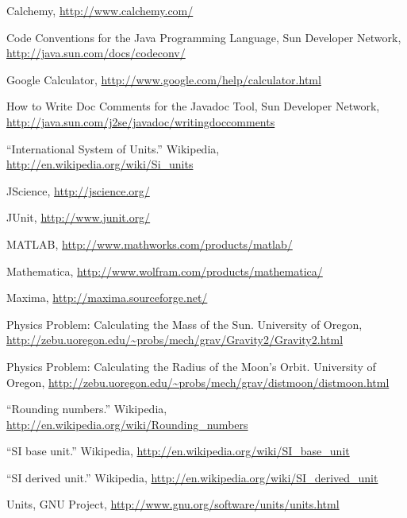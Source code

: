 \begin{thebibliography}{99}

 Calchemy, \url{http://www.calchemy.com/}

 Code Conventions for the Java Programming
  Language, Sun Developer Network,
  \url{http://java.sun.com/docs/codeconv/}

 Google Calculator,
  \url{http://www.google.com/help/calculator.html}

 How to Write Doc Comments for the Javadoc Tool, Sun
  Developer Network,
  \url{http://java.sun.com/j2se/javadoc/writingdoccomments}

 ``International System of Units.''  Wikipedia,
  \url{http://en.wikipedia.org/wiki/Si_units}

 JScience, \url{http://jscience.org/}

 JUnit, \url{http://www.junit.org/}

 MATLAB,
  \url{http://www.mathworks.com/products/matlab/}

 Mathematica,
  \url{http://www.wolfram.com/products/mathematica/}

 Maxima, \url{http://maxima.sourceforge.net/}

 Physics Problem: Calculating the Mass of the Sun.
  University of Oregon,
  \url{http://zebu.uoregon.edu/~probs/mech/grav/Gravity2/Gravity2.html}

 Physics Problem: Calculating the Radius of the
  Moon's Orbit.  University of Oregon,
  \url{http://zebu.uoregon.edu/~probs/mech/grav/distmoon/distmoon.html}

 ``Rounding numbers.''  Wikipedia,
  \url{http://en.wikipedia.org/wiki/Rounding_numbers}

 ``SI base unit.''  Wikipedia,
  \url{http://en.wikipedia.org/wiki/SI_base_unit}

 ``SI derived unit.''  Wikipedia,
  \url{http://en.wikipedia.org/wiki/SI_derived_unit}

 Units, GNU Project,
  \url{http://www.gnu.org/software/units/units.html}


\end{thebibliography}
